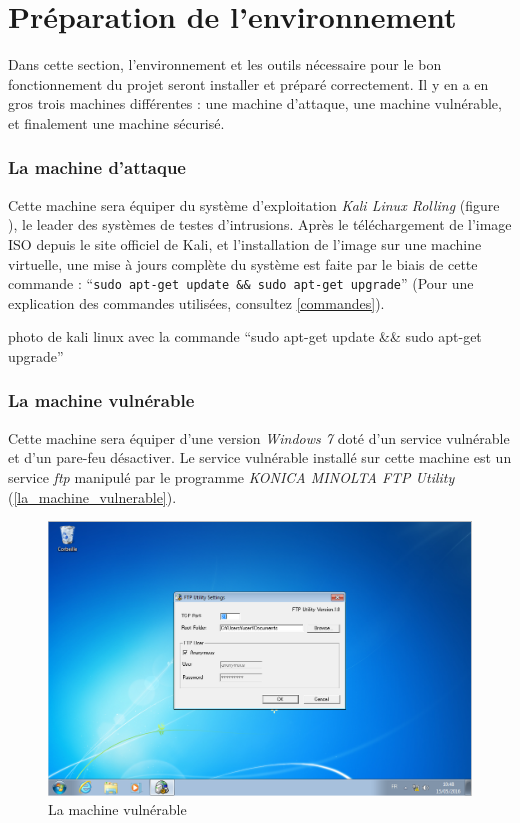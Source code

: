 
\newpage

\section{Préparation de l'environnement}
Dans cette section, l'environnement et les outils nécessaire pour le bon fonctionnement du projet seront installer
et préparé correctement. Il y en a en gros trois machines différentes : une machine d'attaque, une machine vulnérable,
et finalement une machine sécurisé.

    \subsubsection{La machine d'attaque} 
    Cette machine sera équiper du système d'exploitation \emph{Kali Linux \cite{linux} Rolling} (figure ), le 
    leader des systèmes de testes d'intrusions. Après le téléchargement de l'image
    ISO depuis le site officiel de Kali, et l'installation de l'image sur
    une machine virtuelle, une mise à jours complète du système est faite par le biais de cette commande : 
    ``\texttt{sudo apt-get update \&\& sudo apt-get upgrade}'' (Pour une explication des commandes utilisées,
    consultez \autoref{commandes}).
        \begin{center}
            photo de kali linux avec la commande ``sudo apt-get update \&\& sudo apt-get upgrade''
        \end{center}

    \subsubsection{La machine vulnérable} \label{machine_vulnerable} 
    Cette machine sera équiper d'une version \emph{Windows 7}  
    doté d'un service vulnérable et d'un pare-feu désactiver. Le service vulnérable installé sur cette 
    machine est un service \emph{ftp} manipulé par le programme \emph{KONICA MINOLTA FTP Utility} 
    (\autoref{la_machine_vulnerable}).
    \begin{figure}[h!]
        \centering
        \includegraphics[scale=0.3]{images/Windows_7_2.png}
        \caption{La machine vulnérable}
        \label{la_machine_vulnerable}
    \end{figure}

